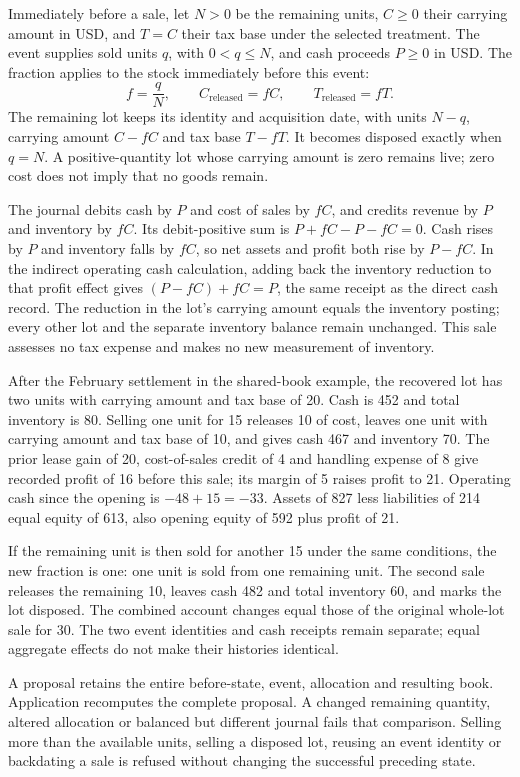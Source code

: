 Immediately before a sale, let $N>0$ be the remaining units, $C\geq0$ their
carrying amount in USD, and $T=C$ their tax base under the selected treatment.
The event supplies sold units $q$, with $0<q\leq N$, and cash proceeds $P\geq0$
in USD. The fraction applies to the stock immediately before this event:
\[
 f=\frac{q}{N},\qquad
 C_{\mathrm{released}}=fC,\qquad
 T_{\mathrm{released}}=fT.
\]
The remaining lot keeps its identity and acquisition date, with units $N-q$,
carrying amount $C-fC$ and tax base $T-fT$. It becomes disposed exactly when
$q=N$. A positive-quantity lot whose carrying amount is zero remains live;
zero cost does not imply that no goods remain.

The journal debits cash by $P$ and cost of sales by $fC$, and credits revenue
by $P$ and inventory by $fC$. Its debit-positive sum is
$P+fC-P-fC=0$. Cash rises by $P$ and inventory falls by $fC$, so net assets and
profit both rise by $P-fC$. In the indirect operating cash calculation, adding
back the inventory reduction to that profit effect gives
$(P-fC)+fC=P$, the same receipt as the direct cash record. The reduction in
the lot's carrying amount equals the inventory posting; every other lot and
the separate inventory balance remain unchanged. This sale assesses no tax
expense and makes no new measurement of inventory.

After the February settlement in the shared-book example, the recovered lot
has two units with carrying amount and tax base of 20. Cash is 452 and total
inventory is 80. Selling one unit for 15 releases 10 of cost, leaves one unit
with carrying amount and tax base of 10, and gives cash 467 and inventory 70.
The prior lease gain of 20, cost-of-sales credit of 4 and handling expense of 8
give recorded profit of 16 before this sale; its margin of 5 raises profit to
21. Operating cash since the opening is $-48+15=-33$. Assets of 827 less
liabilities of 214 equal equity of 613, also opening equity of 592 plus profit
of 21.

If the remaining unit is then sold for another 15 under the same conditions,
the new fraction is one: one unit is sold from one remaining unit. The second
sale releases the remaining 10, leaves cash 482 and total inventory 60, and
marks the lot disposed. The combined account changes equal those of the
original whole-lot sale for 30. The two event identities and cash receipts
remain separate; equal aggregate effects do not make their histories identical.

A proposal retains the entire before-state, event, allocation and resulting
book. Application recomputes the complete proposal. A changed remaining
quantity, altered allocation or balanced but different journal fails that
comparison. Selling more than the available units, selling a disposed lot,
reusing an event identity or backdating a sale is refused without changing
the successful preceding state.

